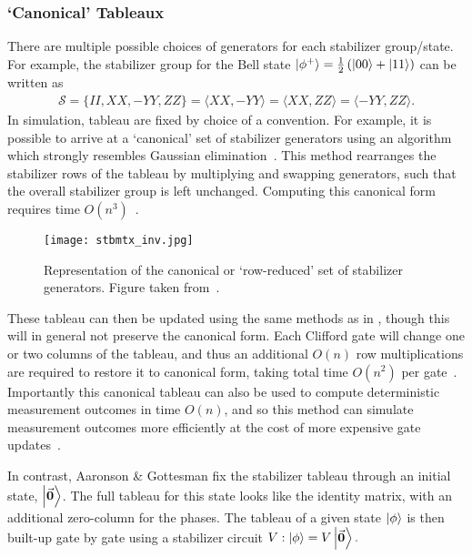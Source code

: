 \subsubsection*{`Canonical' Tableaux}
There are multiple possible choices of generators for each stabilizer group/state. For example, the stabilizer group for the Bell state $\ket{\phi^{+}}=\frac{1}{2}\left(\ket{00}+\ket{11}\right)$ can be written as
\begin{align}
    \mathcal{S} = \{II, XX, -YY, ZZ\} = \langle XX,-YY\rangle = \langle XX, ZZ\rangle = \langle -YY,ZZ\rangle.
\end{align}
In simulation, tableau are fixed by choice of a convention. For example, it is possible to arrive at a `canonical' set of stabilizer generators using an algorithm which strongly resembles Gaussian elimination~\cite{Garcia2012}. This method rearranges the stabilizer rows of the tableau by multiplying and swapping generators, such that the overall stabilizer group is left unchanged. Computing this canonical form requires  time $O(n^{3})$~\cite{Garcia2012}.
\begin{figure}[H]
    \centering
    \texttt{[image: stbmtx\_inv.jpg]}
    \caption{Representation of the canonical or `row-reduced' set of stabilizer generators. Figure taken from~\cite{Garcia2012}.}
\label{fig:canoncialtableau}
\end{figure}
These tableau can then be updated using the same methods as in \cite{Aaronson2004}, though this will in general not preserve the canonical form. Each Clifford gate will change one or two columns of the tableau, and thus an additional $O(n)$ row multiplications are required to restore it to canonical form, taking total time $O(n^{2})$ per gate~\cite{Garcia2015}.
Importantly this canonical tableau can also be used to compute deterministic measurement outcomes in time $O(n)$, and so this method can simulate measurement outcomes more efficiently at the cost of more expensive gate updates~\cite{Garcia2015}.\par
In contrast, Aaronson \& Gottesman fix the stabilizer tableau through an initial state, $\ket{\va{0}}$. The full tableau for this state looks like the identity matrix, with an additional zero-column for the phases. The tableau of a given state $\ket{\phi}$ is then built-up gate by gate using a stabilizer circuit $V:\ket{\phi}=V\ket{\va{0}}.$
